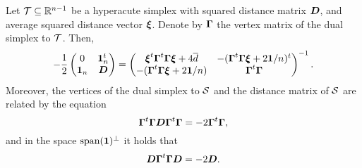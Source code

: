\begin{lemma}
	Let $\mathcal{T}\subseteq\mathbb{R}^{n-1}$ be a hyperacute simplex with  squared distance matrix $\vb*{D}$, and average squared distance vector $\vb*{\xi}$. Denote by $\vb*{\Gamma}$ the vertex matrix of the dual simplex to $\mathcal{T}$. Then, 
	\begin{equation}
	\label{eq:simplex_block_matrix}
	-\frac{1}{2} \begin{pmatrix}
	0 & \vb{1}_n^t \\ 
	\vb{1}_n &  \vb*{D}
	\end{pmatrix} = \begin{pmatrix}
	\vb*{\xi}^t \vb*{\Gamma}^t \vb*{\Gamma}\vb*{\xi} + 4\overline{d} & -(\vb*{\Gamma}^t \vb*{\Gamma}\vb*{\xi} + 2\vb{1}/n)^t \\
	-(\vb*{\Gamma}^t \vb*{\Gamma}\vb*{\xi} + 2\vb{1}/n) & \vb*{\Gamma}^t \vb*{\Gamma}
	\end{pmatrix}^{-1}.
	\end{equation}
	Moreover, the vertices of the dual simplex to $\mathcal{S}$ and the distance matrix of $\mathcal{S}$ are related by the equation
	\begin{equation}
	\label{eq:lem_inverse_relation}
	\vb*{\Gamma}^t \vb*{\Gamma} \vb*{D} \vb*{\Gamma}^t \vb*{\Gamma} = -2\vb*{\Gamma}^t \vb*{\Gamma},
	\end{equation}
	and in the space $\textnormal{span}(\vb{1})^\perp$ it holds that 
	\begin{equation*}
	\label{eq:lem_inverse_relation2}
	\vb*{D}\vb*{\Gamma}^t \vb*{\Gamma} \vb*{D}= -2\vb*{D}.	
	\end{equation*}
\end{lemma}

